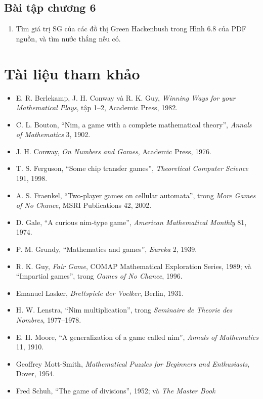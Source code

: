 \documentclass[11pt]{article}
\begin{document}
\subsection{Bài tập chương 6}

\begin{enumerate}
  \item Tìm giá trị SG của các đồ thị Green Hackenbush trong Hình 6.8 của PDF
  nguồn, và tìm nước thắng nếu có.
\end{enumerate}

\section{Tài liệu tham khảo}

\begin{itemize}
  \item E. R. Berlekamp, J. H. Conway và R. K. Guy, \textit{Winning Ways for
  your Mathematical Plays}, tập 1--2, Academic Press, 1982.
  \item C. L. Bouton, ``Nim, a game with a complete mathematical theory'',
  \textit{Annals of Mathematics} 3, 1902.
  \item J. H. Conway, \textit{On Numbers and Games}, Academic Press, 1976.
  \item T. S. Ferguson, ``Some chip transfer games'', \textit{Theoretical
  Computer Science} 191, 1998.
  \item A. S. Fraenkel, ``Two-player games on cellular automata'', trong
  \textit{More Games of No Chance}, MSRI Publications 42, 2002.
  \item D. Gale, ``A curious nim-type game'', \textit{American Mathematical
  Monthly} 81, 1974.
  \item P. M. Grundy, ``Mathematics and games'', \textit{Eureka} 2, 1939.
  \item R. K. Guy, \textit{Fair Game}, COMAP Mathematical Exploration Series,
  1989; và ``Impartial games'', trong \textit{Games of No Chance}, 1996.
  \item Emanuel Lasker, \textit{Brettspiele der Voelker}, Berlin, 1931.
  \item H. W. Lenstra, ``Nim multiplication'', trong \textit{Seminaire de
  Theorie des Nombres}, 1977--1978.
  \item E. H. Moore, ``A generalization of a game called nim'',
  \textit{Annals of Mathematics} 11, 1910.
  \item Geoffrey Mott-Smith, \textit{Mathematical Puzzles for Beginners and
  Enthusiasts}, Dover, 1954.
  \item Fred Schuh, ``The game of divisions'', 1952; và \textit{The Master Book
}
\end{itemize}
\end{document}
